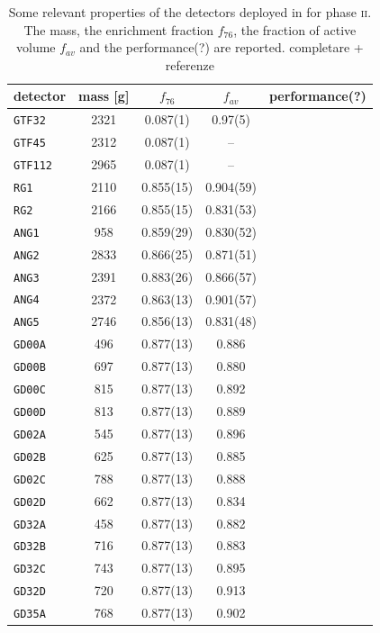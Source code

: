 \begin{table}
	\begin{center}
		\caption{Some relevant properties of the detectors deployed in {\gerda} for phase \textsc{ii}. The mass, the enrichment fraction $f_{76}$, the fraction of active volume $f_{av}$ and the performance(?) are reported. {\color{red}completare + referenze}}
	\begin{tabular}{lcccc}
		\toprule
		detector		&	mass [g]	&	$f_{76}$	&	$f_{av}$	&	performance(?) \\
		\midrule
		\texttt{GTF32}	&	2321	&	0.087(1)	&	0.97(5)		&		\\
		\texttt{GTF45}	&	2312	&	0.087(1)	&	--			&		\\
		\texttt{GTF112}	&	2965	&	0.087(1)	&	--			&		\\
		\texttt{RG1}	&	2110	&	0.855(15)	&	0.904(59)	&		\\
		\texttt{RG2}	&	2166	&	0.855(15)	&	0.831(53)	&		\\
		\texttt{ANG1}	&	958 	&	0.859(29)	&	0.830(52)	&		\\
		\texttt{ANG2}	&	2833	&	0.866(25)	&	0.871(51)	&		\\
		\texttt{ANG3}	&	2391	&	0.883(26)	&	0.866(57)	&		\\
		\texttt{ANG4}	&	2372	&	0.863(13)	&	0.901(57)	&		\\
		\texttt{ANG5}	&	2746	&	0.856(13)	&	0.831(48)	&		\\
		\texttt{GD00A}	&	496 	&	0.877(13)	&	0.886   	&		\\
		\texttt{GD00B}	&	697 	&	0.877(13)	&	0.880   	&		\\
		\texttt{GD00C}	&	815 	&	0.877(13)	&	0.892   	&		\\
		\texttt{GD00D}	&	813 	&	0.877(13)	&	0.889   	&		\\
		\texttt{GD02A}	&	545 	&	0.877(13)	&	0.896   	&		\\
		\texttt{GD02B}	&	625 	&	0.877(13)	&	0.885   	&		\\
		\texttt{GD02C}	&	788 	&	0.877(13)	&	0.888   	&		\\
		\texttt{GD02D}	&	662 	&	0.877(13)	&	0.834   	&		\\
		\texttt{GD32A}	&	458 	&	0.877(13)	&	0.882   	&		\\
		\texttt{GD32B}	&	716 	&	0.877(13)	&	0.883   	&		\\
		\texttt{GD32C}	&	743 	&	0.877(13)	&	0.895   	&		\\
		\texttt{GD32D}	&	720 	&	0.877(13)	&	0.913   	&		\\
		\texttt{GD35A}	&	768 	&	0.877(13)	&	0.902   	&		\\

\end{tabular}
\end{center}
\end{table}
